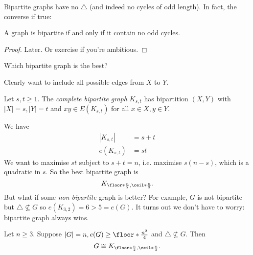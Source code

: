 \documentclass[a4paper]{article}
\begin{document}
Bipartite graphs have no \(\triangle\) (and indeed no cycles of odd length). In fact, the converse if true:

\begin{theorem}
  A graph is bipartite if and only if it contain no odd cycles.
\end{theorem}

\begin{proof}
  Later. Or exercise if you're ambitious.
\end{proof}

\begin{question}
  Which bipartite graph is the best?
\end{question}

Clearly want to include all possible edges from \(X\) to \(Y\).

\begin{definition}
  Let \(s,t\geq 1\). The \emph{complete bipartite graph} \(K_{s,t}\) has bipartition \((X,Y)\) with \(|X| = s, |Y| = t\) and \(xy \in E(K_{s,t})\) for all \(x\in X, y\in Y\).
\end{definition}

We have
\begin{align*}
  |K_{s,t}| &= s+t \\
  e(K_{s,t}) &= st
\end{align*}
We want to maximise \(st\) subject to \(s+t=n\), i.e. maximise \(s(n-s)\), which is a quadratic in \(s\). So the best bipartite graph is
\[
  K_{\floor*{\frac{n}{2}}, \ceil*{\frac{n}{2}}}.
\]
But what if some \emph{non-bipartite} graph is better? For example, \(G\) is not bipartite but \(\triangle \nsubseteq G\) so \(e(K_{3,2}) = 6 > 5 = e(G)\). It turns out we don't have to worry: bipartite graph always wins.

\begin{theorem}
  Let \(n\geq 3\). Suppose \(|G| = n, e(G) \geq \floor*{\frac{n^2}{4}}\) and \(\triangle \nsubseteq G\). Then
  \[
    G \cong K_{\floor*{\frac{n}{2}}, \ceil*{\frac{n}{2}}}.
  \]
\end{theorem}
\end{document}
